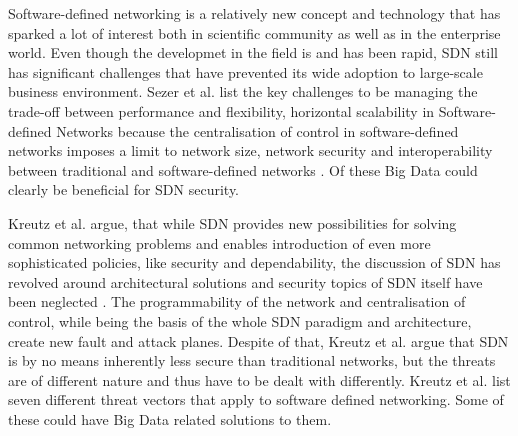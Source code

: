 \documentclass{acm_proc_article-sp}
\begin{document}
Software-defined networking is a relatively new concept and technology that has sparked a lot of interest both in scientific community as well as in the enterprise world. Even though the developmet in the field is and has been rapid, SDN still has significant challenges that have prevented its wide adoption to large-scale business environment. Sezer et al. list the key challenges to be managing the trade-off between performance and flexibility, horizontal scalability in Software-defined Networks because the centralisation of control in software-defined networks imposes a limit to network size, network security and interoperability between traditional and software-defined networks \cite{sezer2013we}. Of these Big Data could clearly be beneficial for SDN security.

Kreutz et al. argue, that while SDN provides new possibilities for solving common networking problems and enables introduction of even more sophisticated policies, like security and dependability, the discussion of SDN has revolved around architectural solutions and security topics of SDN itself have been neglected  \cite{Kreutz13}. The programmability of the network and centralisation of control, while being the basis of the whole SDN paradigm and architecture, create new fault and attack planes. Despite of that, Kreutz et al. argue that SDN is by no means inherently less secure than traditional networks, but the threats are of different nature and thus have to be dealt with differently.
Kreutz et al. list seven different threat vectors that apply to software defined networking. Some of these could have Big Data related solutions to them.
\end{document}
